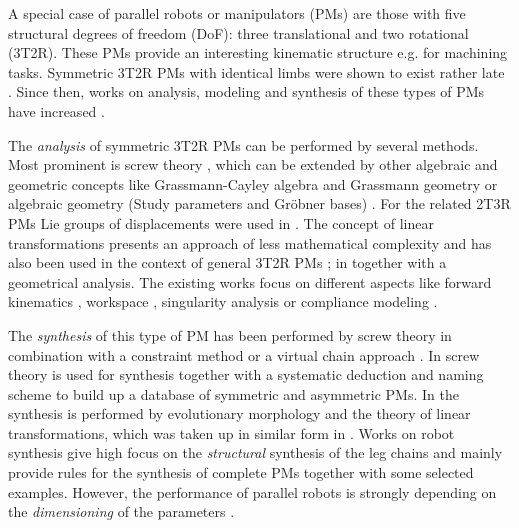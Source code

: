 \documentclass[
	graybox,
	vecphys] %
	{svmult}
\begin{document}
A special case of parallel robots or manipulators (PMs) are those with five structural degrees of freedom (DoF): three translational and two rotational (3T2R).
These PMs provide an interesting kinematic structure e.g. for machining tasks. %
Symmetric 3T2R PMs with identical limbs were shown to exist rather late \cite{FangTsa2002,HuangLi2003}.
Since then, works on analysis, modeling and synthesis of these types of PMs have increased %
\cite{MotevalliZohSoh2010,GallardoAlvaradoAbeIsl2019}.

The \emph{analysis} of symmetric 3T2R PMs can be performed by several methods.
Most prominent is screw theory \cite{FangTsa2002,KongGos2007,MasoulehGosHusWal2011,GallardoAlvaradoAbeIsl2019}, which can be extended by other algebraic and geometric concepts like Grassmann-Cayley algebra and Grassmann geometry \cite{AmineMasCarWen2012} or algebraic geometry (Study parameters and Gröbner bases) \cite{MasoulehGosHusWal2011}.
For the related 2T3R PMs Lie groups of displacements were used in \cite{LiHuaHer2004}.
The concept of linear transformations presents an approach of less mathematical complexity and has also been used in the context of general 3T2R PMs \cite{Gogu2008}; in \cite{MotevalliZohSoh2010} together with a geometrical analysis.
The existing works focus on different aspects like forward kinematics \cite{MasoulehGosHusWal2011},  %
workspace \cite{MasoulehSaaGosTag2010}, singularity analysis \cite{MasoulehGos2011,AmineMasCarWen2012} or compliance modeling \cite{CaoDinYan2017}.


The \emph{synthesis} of this type of PM has been performed by screw theory in combination with a constraint method \cite{HuangLi2003} or a virtual chain approach \cite{KongGos2007}.
In \cite{DingCaoCaiKec2015} screw theory is used for synthesis together with a systematic deduction and naming scheme to build up a database of symmetric and asymmetric PMs.
In \cite{Gogu2008} the synthesis is performed by evolutionary morphology and the theory of linear transformations, which was taken up in similar form in \cite{MotevalliZohSoh2010}.
%
Works on robot synthesis give high focus on the \emph{structural} synthesis of the leg chains and mainly provide rules for the synthesis of complete PMs together with some selected examples.
However, the performance of parallel robots is strongly depending on the \emph{dimensioning} of the parameters \cite{Merlet2006}.
\end{document}
